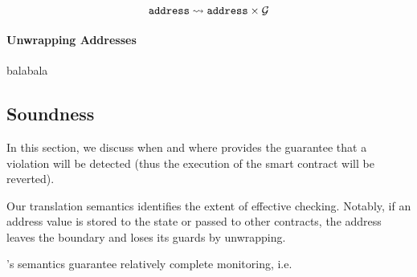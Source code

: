 $$
\texttt{address} \leadsto \texttt{address} \times \mathcal{G}
$$

\paragraph{Unwrapping Addresses} balabala

\subsection{Soundness}

In this section, we discuss when and where \corelang provides the guarantee
that a violation will be detected (thus the execution of the smart contract
will be reverted).

Our translation semantics identifies the extent of effective checking.
Notably, if an address value is stored to the state or passed to other
contracts, the address leaves the boundary and loses its guards by unwrapping.


\corelang's semantics guarantee relatively complete monitoring, i.e.


